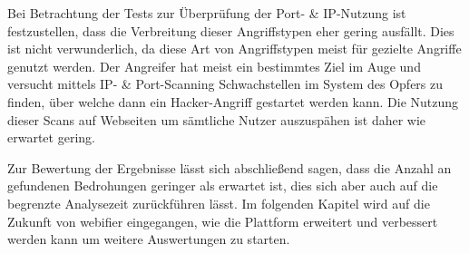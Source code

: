 Bei Betrachtung der Tests zur Überprüfung der Port- \& IP-Nutzung ist festzustellen, dass die Verbreitung dieser Angriffstypen eher gering ausfällt. Dies ist nicht verwunderlich, da diese Art von Angriffstypen meist für gezielte Angriffe genutzt werden. Der Angreifer hat meist ein bestimmtes Ziel im Auge und versucht mittels IP- \& Port-Scanning Schwachstellen im System des Opfers zu finden, über welche dann ein Hacker-Angriff gestartet werden kann. Die Nutzung dieser Scans auf Webseiten um sämtliche Nutzer auszuspähen ist daher wie erwartet gering.

Zur Bewertung der Ergebnisse lässt sich abschließend sagen, dass die Anzahl an gefundenen Bedrohungen geringer als erwartet ist, dies sich aber auch auf die begrenzte Analysezeit zurückführen lässt. Im folgenden Kapitel wird auf die Zukunft von webifier eingegangen, wie die Plattform erweitert und verbessert werden kann um weitere Auswertungen zu starten.
